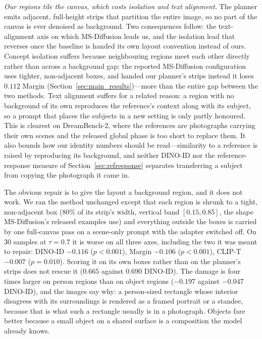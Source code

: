 \documentclass[review,10pt,times]{elsarticle}
\begin{document}
\noindent\textit{Our regions tile the canvas, which costs isolation and text
alignment.}
The planner emits adjacent, full-height strips that partition the entire
image, so no part of the canvas is ever denoised as background.  Two
consequences follow: the text-alignment axis on which MS-Diffusion leads us,
and the isolation lead that reverses once the baseline is handed its own
layout convention instead of ours.  Concept isolation suffers because neighbouring
regions meet each other directly rather than across a background gap: the
reported MS-Diffusion configuration uses tighter, non-adjacent boxes, and
handed our planner's strips instead it loses $0.112$ Margin
(Section~\ref{sec:main_results})---more than the entire gap between the two
methods.  Text alignment suffers for a related reason: a region with no
background of its own reproduces the reference's context along with its
subject, so a prompt that places the subjects in a new setting is only
partly honoured.  This is clearest on DreamBench-2, where the references
are photographs carrying their own scenes and the released global phase is
too short to replace them.  It also bounds how our identity numbers should
be read---similarity to a reference is raised by reproducing its
background, and neither DINO-ID nor the reference-response measure of
Section~\ref{sec:refresponse} separates transferring a subject from copying
the photograph it came in.

The obvious repair is to give the layout a background region, and it does not
work.  We ran the method unchanged except that each region is shrunk to a
tight, non-adjacent box ($80\%$ of its strip's width, vertical band
$[0.15,0.85]$, the shape MS-Diffusion's released examples use) and everything
outside the boxes is carried by one full-canvas pass on a scene-only prompt
with the adapter switched off.  On 30 samples at $\tau{=}0.7$ it is worse on
all three axes, including the two it was meant to repair: DINO-ID $-0.116$
($p{<}0.001$), Margin $-0.106$ ($p{<}0.001$), CLIP-T $-0.007$ ($p{=}0.010$).
Scoring it on its own boxes rather than on the planner's strips does not
rescue it ($0.665$ against $0.690$ DINO-ID).  The damage is four times larger
on person regions than on object regions ($-0.197$ against $-0.047$ DINO-ID),
and the images say why: a person-sized rectangle whose interior disagrees with
its surroundings is rendered as a framed portrait or a standee, because that
is what such a rectangle usually is in a photograph.  Objects fare better
because a small object on a shared surface is a composition the model already
knows.
\end{document}
